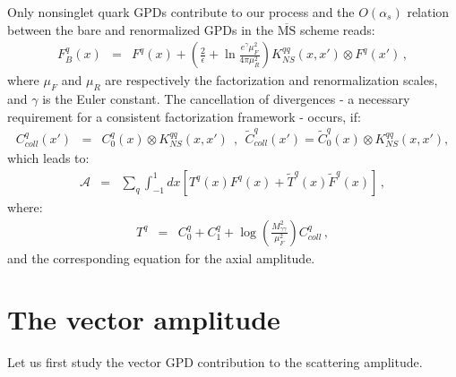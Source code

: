 \documentclass[aps,prd,superscriptaddress,floatfix,showpacs]{revtex4}
\begin{document}
Only nonsinglet quark GPDs contribute to our process and the $O(\alpha_s)$ relation between the bare and renormalized GPDs in the $\overline{\mathrm{MS}}$ scheme reads:
\begin{eqnarray}
F_B^q(x) &=& F^q(x) 
+ \left(\frac{2}{\epsilon} +\ln\frac{e^\gamma \mu_F^2}{4\pi\mu_R^2} \right) K^{qq}_{NS}(x,x')\otimes F^q(x')\,,
\label{eq:evolution}
\end{eqnarray}
where $\mu_F$ and $\mu_R$ are respectively the factorization and renormalization scales, and $\gamma$ is the Euler constant. The cancellation of divergences - a necessary requirement for a consistent factorization framework - occurs, if:
\begin{eqnarray}
C_{coll}^{q}(x') &=& C_0^q(x) \otimes K_{NS}^{qq}(x,x')~~,~~ \widetilde C_{coll}^{q}(x') = \widetilde C_0^q(x) \otimes K_{NS}^{qq}(x,x'),
\label{eq:div_cancel}
\end{eqnarray}
which leads to:
\begin{eqnarray}
\mathcal{A} &=& \sum_q\int_{-1}^1 dx \left[
 T^q(x) F^q(x)  
+ \widetilde{T}^q(x) \widetilde{F}^q(x)
 \right]
 \,,
\label{eq:factorizedamplitude}
\end{eqnarray}
where:
\begin{eqnarray}
T^q &=&
C_0^q 
+ C_1^{q}
+\log
\left(
\frac{M^2_{\gamma\gamma}}{\mu_F^2}
\right) C_{coll}^{q} 
\,,
\label{eq:coeff}
\end{eqnarray}
and the corresponding equation for the axial amplitude.
\section{The vector amplitude}
Let us first study the vector GPD contribution to the scattering amplitude.
\end{document}
